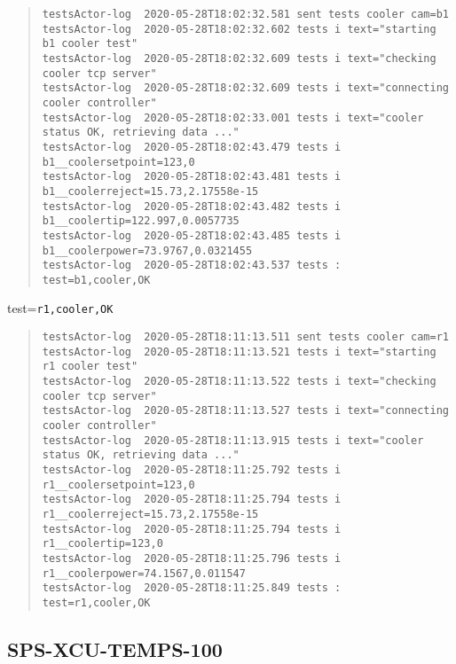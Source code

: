 \begin{quote}
\begin{tiny}
\begin{verbatim}
testsActor-log  2020-05-28T18:02:32.581 sent tests cooler cam=b1
testsActor-log  2020-05-28T18:02:32.602 tests i text="starting b1 cooler test"
testsActor-log  2020-05-28T18:02:32.609 tests i text="checking cooler tcp server"
testsActor-log  2020-05-28T18:02:32.609 tests i text="connecting cooler controller"
testsActor-log  2020-05-28T18:02:33.001 tests i text="cooler status OK, retrieving data ..."
testsActor-log  2020-05-28T18:02:43.479 tests i b1__coolersetpoint=123,0
testsActor-log  2020-05-28T18:02:43.481 tests i b1__coolerreject=15.73,2.17558e-15
testsActor-log  2020-05-28T18:02:43.482 tests i b1__coolertip=122.997,0.0057735
testsActor-log  2020-05-28T18:02:43.485 tests i b1__coolerpower=73.9767,0.0321455
testsActor-log  2020-05-28T18:02:43.537 tests : test=b1,cooler,OK
\end{verbatim}
\end{tiny}
\end{quote}

\noindent test=\texttt{r1,cooler,OK}

\begin{quote}
\begin{tiny}
\begin{verbatim}
testsActor-log  2020-05-28T18:11:13.511 sent tests cooler cam=r1
testsActor-log  2020-05-28T18:11:13.521 tests i text="starting r1 cooler test"
testsActor-log  2020-05-28T18:11:13.522 tests i text="checking cooler tcp server"
testsActor-log  2020-05-28T18:11:13.527 tests i text="connecting cooler controller"
testsActor-log  2020-05-28T18:11:13.915 tests i text="cooler status OK, retrieving data ..."
testsActor-log  2020-05-28T18:11:25.792 tests i r1__coolersetpoint=123,0
testsActor-log  2020-05-28T18:11:25.794 tests i r1__coolerreject=15.73,2.17558e-15
testsActor-log  2020-05-28T18:11:25.794 tests i r1__coolertip=123,0
testsActor-log  2020-05-28T18:11:25.796 tests i r1__coolerpower=74.1567,0.011547
testsActor-log  2020-05-28T18:11:25.849 tests : test=r1,cooler,OK

\end{verbatim}
\end{tiny}
\end{quote}

\subsection{SPS-XCU-TEMPS-100}
\label{sec:tc-100}


